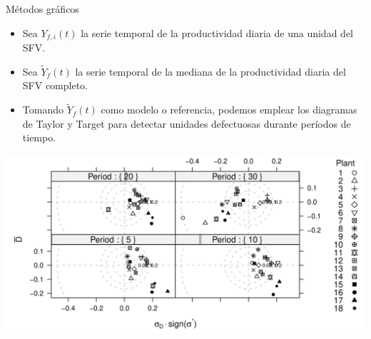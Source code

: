 \documentclass[aspectratio=169, usenames,svgnames,dvipsnames]{beamer}
\begin{document}
\begin{frame}[label={sec:orgf6aec8b}]{Métodos gráficos}
\begin{itemize}
\item Sea \(Y_{f,i}(t)\) la serie temporal de la productividad diaria de \alert{una unidad} del SFV.
\item Sea \(\widetilde{Y}_{f}(t)\) la serie temporal de la \alert{mediana} de la productividad diaria del SFV \alert{completo}.
\item Tomando \(\widetilde{Y}_{f}(t)\) como modelo o referencia, podemos emplear los diagramas de Taylor y Target para detectar unidades defectuosas durante períodos de tiempo.
\end{itemize}

\begin{center}
\includegraphics[height=0.6\textheight]{../figs/TargetDiagram_Dia120.pdf}
\end{center}
\end{frame}
\end{document}
